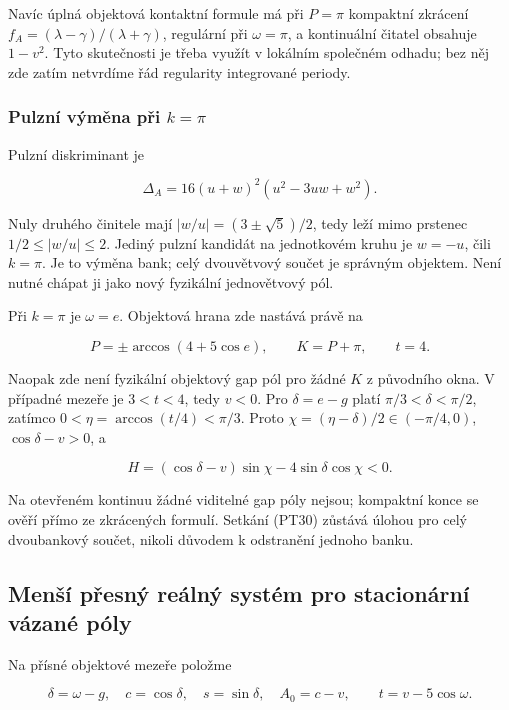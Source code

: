 \documentclass[11pt,a4paper]{article}
\theoremstyle{remark}\newtheorem{remark}[theorem]{Poznámka}
\numberwithin{equation}{section}
\begin{document}
Navíc úplná objektová kontaktní formule má při \(P=\pi\)
kompaktní zkrácení
\(f_A=(\lambda-\gamma)/(\lambda+\gamma)\), regulární při
\(\omega=\pi\), a kontinuální čitatel obsahuje \(1-v^2\).
Tyto skutečnosti je třeba využít v lokálním společném odhadu;
bez něj zde zatím netvrdíme řád regularity integrované periody.

\subsubsection{Pulzní výměna při \texorpdfstring{$k=\pi$}{k=pi}}\label{pulznuxed-vuxfdmux11bna-v-kpi}

Pulzní diskriminant je

\[
\Delta_A=16(u+w)^2(u^2-3uw+w^2).
\tag{PT29}
\]

Nuly druhého činitele mají \(|w/u|=(3\pm\sqrt5)/2\), tedy leží
mimo prstenec \(1/2\le|w/u|\le2\).
Jediný pulzní kandidát na jednotkovém kruhu je \(w=-u\),
čili \(k=\pi\). Je to výměna bank; celý dvouvětvový součet je
správným objektem. Není nutné chápat ji jako nový fyzikální
jednovětvový pól.

Při \(k=\pi\) je \(\omega=e\). Objektová hrana zde nastává právě na

\[
P=\pm\arccos(4+5\cos e),\qquad K=P+\pi,\qquad t=4.
\tag{PT30}
\]

Naopak zde není fyzikální objektový gap pól pro žádné \(K\)
z původního okna. V případné mezeře je \(3<t<4\), tedy
\(v<0\). Pro \(\delta=e-g\) platí
\(\pi/3<\delta<\pi/2\), zatímco
\(0<\eta=\arccos(t/4)<\pi/3\). Proto
\(\chi=(\eta-\delta)/2\in(-\pi/4,0)\),
\(\cos\delta-v>0\), a

\[
H=(\cos\delta-v)\sin\chi
-4\sin\delta\cos\chi<0.
\tag{PT31}
\]

Na otevřeném kontinuu žádné viditelné gap póly nejsou; kompaktní
konce se ověří přímo ze zkrácených formulí. Setkání (PT30)
zůstává úlohou pro celý dvoubankový součet, nikoli důvodem
k odstranění jednoho banku.

\subsection{Menší přesný reálný systém pro stacionární vázané póly}\label{menux161uxed-pux159esnuxfd-reuxe1lnuxfd-systuxe9m-pro-stacionuxe1rnuxed-vuxe1zanuxe9-puxf3ly}

Na přísné objektové mezeře položme

\[
\delta=\omega-g,\quad c=\cos\delta,\quad s=\sin\delta,\quad
A_0=c-v,\qquad t=v-5\cos\omega.
\]
\end{document}
